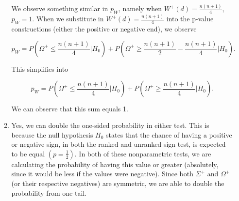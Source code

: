 \documentclass{article}
\begin{document}
\begin{enumerate}
\begin{enumerate}
			We observe something similar in $p_W$, namely when $W^+(d) = \frac{n(n+1)}{4}$, $p_W = 1$. When we substitute in $W^+(d) = \frac{n(n+1)}{4}$ into the p-value constructions (either the positive or negative end), we observe

			$$p_W = P(\Omega^+ \leq \frac{n(n+1)}{4} | H_0) + P(\Omega^+ \geq \frac{n(n+1)}{2} - \frac{n(n+1)}{4} | H_0).$$

			This simplifies into

			$$p_W = P(\Omega^+ \leq \frac{n(n+1)}{4} | H_0) + P(\Omega^+ \geq \frac{n(n+1)}{4} | H_0).$$

			We can observe that this sum equals 1.

			\item Yes, we can double the one-sided probability in either test. This is because the null hypothesis $H_0$ states that the chance of having a positive or negative sign, in both the ranked and unranked sign test, is expected to be equal $(p = \frac{1}{2})$. In both of these nonparametric tests, we are calculating the probability of having this value or greater (absolutely, since it would be less if the values were negative). Since both $\Sigma^+$ and $\Omega^+$ (or their respective negatives) are symmetric, we are able to double the probability from one tail. 
		\end{enumerate}
		
	\end{enumerate}
\end{document}
